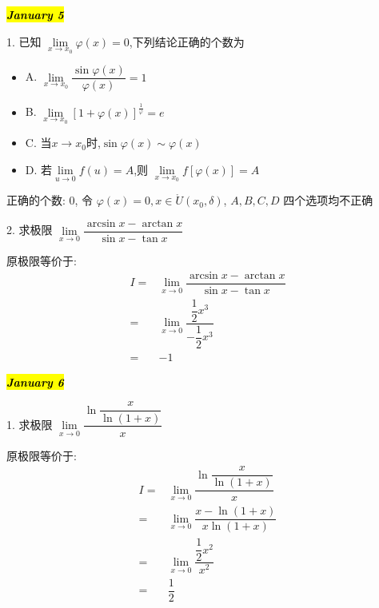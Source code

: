 \hl{\textbf{\textit{January 5}}}

1. 已知 $\lim\limits_{x\to x_{0}}\varphi(x)=0$,下列结论正确的个数为
\begin{itemize}
	\item A. $\lim\limits_{x\to x_{0}}\dfrac{\sin\varphi(x)}{\varphi(x)}=1$
	\item B. $\lim\limits_{x\to x_{0}}[1+\varphi(x)]^{\frac{1}{\varphi}}=e$
	\item C. 当$x\to x_{0}$时,$\sin \varphi(x)\sim \varphi(x)$
	\item D. 若$\lim\limits_{u\to 0}f(u)=A$,则 $\lim\limits_{x\to x_{0}}f[\varphi(x)]=A$
\end{itemize}
\begin{solution}

	正确的个数: $0$, 令 $\varphi(x) = 0,x\in \mathring{U}(x_{0},\delta)$, $A,B,C,D$ 四个选项均不正确
\end{solution}

2. 求极限 $\lim\limits_{x\to 0}\dfrac{\arcsin x-\arctan x}{\sin x-\tan x}$
\begin{solution}

	原极限等价于:
	\begin{align*}
		I = & \lim\limits_{x\to 0}\dfrac{\arcsin x-\arctan x}{\sin x-\tan x}\\
		  = & \lim\limits_{x\to 0}\dfrac{\dfrac{1}{2}x^{3}}{-\dfrac{1}{2}x^{3}}\\
		  = & -1 
	\end{align*}
\end{solution}
\hl{\textbf{\textit{January 6}}}

1. 求极限 $\lim\limits_{x\to 0}\dfrac{\ln\dfrac{x}{\ln(1+x)}}{x}$
\begin{solution}

	原极限等价于:
	\begin{align*}
		I = & \lim\limits_{x\to 0}\dfrac{\ln\dfrac{x}{\ln(1+x)}}{x}\\
		  = & \lim\limits_{x\to 0}\dfrac{x-\ln(1+x)}{x\ln (1+x)}\\
		  = & \lim\limits_{x\to 0}\dfrac{\dfrac{1}{2}x^{2}}{x^{2}}\\
		  = & \dfrac{1}{2}
	\end{align*}
\end{solution}

